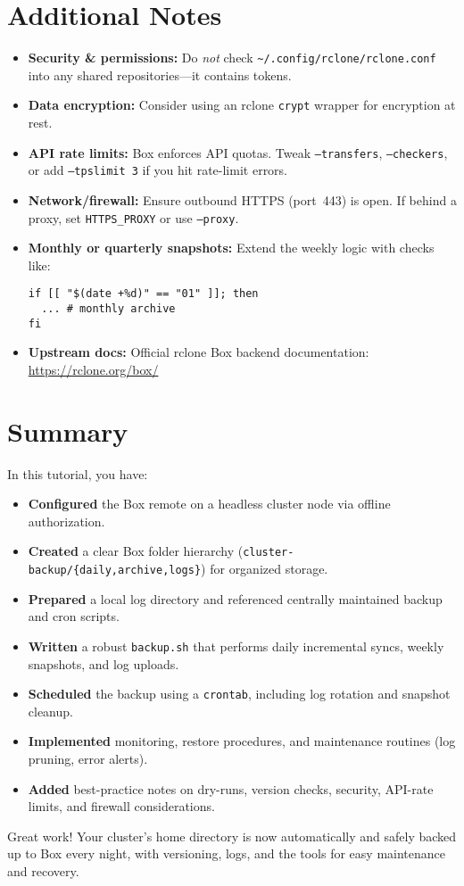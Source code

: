 \documentclass[12pt,letterpaper]{article}
\begin{document}
\section{Additional Notes}
\begin{itemize}
  \item \textbf{Security \& permissions:}
    Do \emph{not} check \verb|~/.config/rclone/rclone.conf| into any shared repositories—it contains tokens.
  \item \textbf{Data encryption:}
    Consider using an rclone \texttt{crypt} wrapper for encryption at rest.
  \item \textbf{API rate limits:}
    Box enforces API quotas. Tweak \texttt{--transfers}, \texttt{--checkers}, or add \texttt{--tpslimit 3} if you hit rate-limit errors.
  \item \textbf{Network/firewall:}
    Ensure outbound HTTPS (port~443) is open. If behind a proxy, set \verb|HTTPS_PROXY| or use \texttt{--proxy}.
  \item \textbf{Monthly or quarterly snapshots:}
    Extend the weekly logic with checks like:
    \begin{lstlisting}[style=custombash]
if [[ "$(date +%d)" == "01" ]]; then
  ... # monthly archive
fi
    \end{lstlisting}
  \item \textbf{Upstream docs:}
    Official rclone Box backend documentation:
    \href{https://rclone.org/box/}{https://rclone.org/box/}
\end{itemize}

\section{Summary}
In this tutorial, you have:
\begin{itemize}
  \item \textbf{Configured} the Box remote on a headless cluster node via offline authorization.
  \item \textbf{Created} a clear Box folder hierarchy (\texttt{cluster-backup/\{daily,archive,logs\}}) for organized storage.
  \item \textbf{Prepared} a local log directory and referenced centrally maintained backup and cron scripts.
  \item \textbf{Written} a robust \texttt{backup.sh} that performs daily incremental syncs, weekly snapshots, and log uploads.
  \item \textbf{Scheduled} the backup using a \texttt{crontab}, including log rotation and snapshot cleanup.
  \item \textbf{Implemented} monitoring, restore procedures, and maintenance routines (log pruning, error alerts).
  \item \textbf{Added} best-practice notes on dry-runs, version checks, security, API-rate limits, and firewall considerations.
\end{itemize}

Great work! Your cluster’s home directory is now automatically and safely backed up to Box every night, with versioning, logs, and the tools for easy maintenance and recovery.
\end{document}
